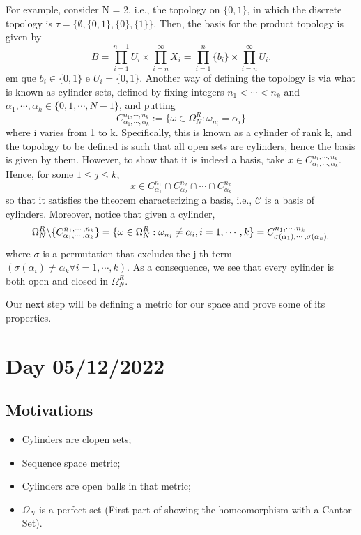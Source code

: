 \documentclass{article}
\newcommand\SLash{\char`\\}
\begin{document}
For example, consider N = 2, i.e., the topology on $\{0, 1\}$, in which the discrete topology is $\tau = \{\emptyset, \{0, 1\}, \{0\}, \{1\}\}$. 
Then, the basis for the product topology is given by 
  $$
  B = \prod\limits_{i=1}^{n-1}U _{i} \times{} \prod\limits_{i=n}^{\infty}X _{i} = \prod\limits_{i=1}^{n}\{b_i\}\times{}\prod\limits_{i=n}^{\infty}U_i.
  $$ 
em que $b _{i}\in\{0, 1\}$ e $U _{i} = \{0, 1\} $. Another way of defining the topology is via what is known as cylinder sets, defined by fixing integers $n _{1} < \cdots < n _{k}$ and $\alpha _{1}, \cdots, 
\alpha _{k}\in \{0, 1, \cdots, N-1\} $, and putting
  $$
  C _{\alpha _{1}, \cdots, \alpha _{k}}^{n _{1}, \cdots, n _{k}}:= \{\omega\in \Omega _{N}^{R}: \omega _{n_i} = \alpha _{i}\}
  $$
where i varies from 1 to k. Specifically, this is known as a cylinder of rank k, and the topology to be defined is
such that all open sets are cylinders, hence the basis is given by them. However, to show that it is indeed a basis,
take $x\in{C _{\alpha _{1}, \cdots, \alpha _{k}}^{n _{1}, \cdots, n _{k}}}$. Hence, for some $1\leq{j}\leq{k}$,
  $$
  x\in C _{\alpha _{1}}^{n _{1}}\cap C _{\alpha _{2}}^{n _{2}} \cap \cdots \cap C _{\alpha _{k}}^{n _{k}}
  $$
so that it satisfies the theorem characterizing a basis, i.e., $\mathcal{C}$ is a basis of cylinders. Moreover,
notice that given a cylinder, 
  $$
  \Omega _{N}^{R}\SLash\{C_{\alpha_{1}, \cdots, \alpha_{k}}^{n_{1}, \cdots, n_{k}}\} = \{\omega\in \Omega_{N}^{R}: \omega_{n_{i}}\neq \alpha_{i}, i = 1, \cdots, k\} = C^{n_{1}, \cdots, n_{k}}_{\sigma(\alpha_{1}), \cdots, \sigma(\alpha_{k}),}
  $$
where $\sigma$ is a permutation that excludes the j-th term $(\sigma(\alpha_{i})\neq \alpha_{k}\forall i=1, \cdots, k).$ As a consequence,
we see that every cylinder is both open and closed in $\Omega_{N}^{R}.$

  Our next step will be defining a metric for our space and prove some of its properties.
\newpage

\section{Day 05/12/2022}
\subsection{Motivations}
\begin{itemize}
  \item Cylinders are clopen sets;
  \item Sequence space metric;
  \item Cylinders are open balls in that metric;
  \item $\Omega_{N}$ is a perfect set (First part of showing the homeomorphism with a Cantor Set).
\end{itemize}
\end{document}
